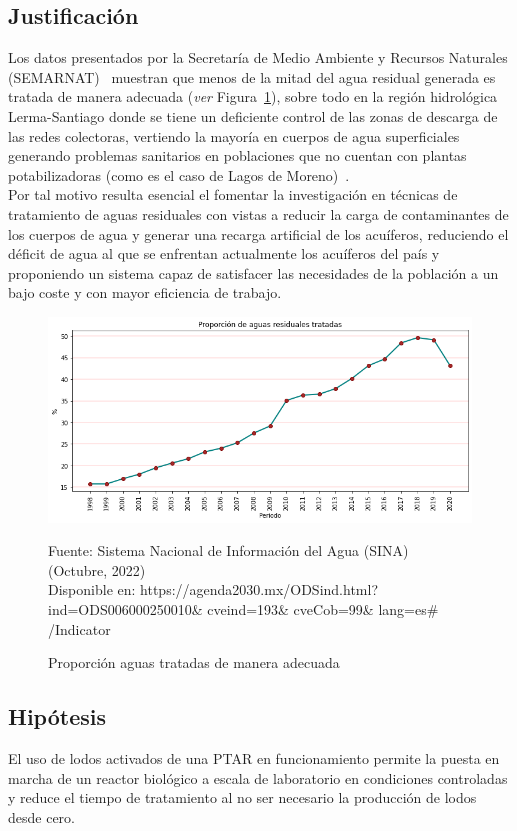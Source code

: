 \subsection*{Justificación}
Los datos presentados por la Secretaría de Medio Ambiente y Recursos Naturales (SEMARNAT)~\emph{\citep{Sis22}} muestran que menos de la mitad del agua residual generada es tratada de manera adecuada (\emph{ver} Figura~\ref{fig:proporcion}), sobre todo en la región hidrológica Lerma-Santiago donde se tiene un deficiente control de las zonas de descarga de las redes colectoras, vertiendo la mayoría en cuerpos de agua superficiales generando problemas sanitarios en poblaciones que no cuentan con plantas potabilizadoras (como es el caso de Lagos de Moreno)~\emph{\citep{aa2030}}.\\
Por tal motivo resulta esencial el fomentar la investigación en técnicas de tratamiento de aguas residuales con vistas a reducir la carga de contaminantes de los cuerpos de agua y generar una recarga artificial de los acuíferos, reduciendo el déficit de agua al que se enfrentan actualmente los acuíferos del país y proponiendo un sistema capaz de satisfacer las necesidades de la población a un bajo coste y con mayor eficiencia de trabajo.
	\begin{figure}[h]
		\centering
		\includegraphics[scale=0.3]{Proporcion_aguas_tratadas.png}
		\caption{Proporción aguas tratadas de manera adecuada}
		\label{fig:proporcion}
		\footnotesize{Fuente: Sistema Nacional de Información del Agua (SINA) (Octubre, 2022)\\
		Disponible en: https://agenda2030.mx/ODSind.html?ind=ODS006000250010\& cveind=193\& cveCob=99\& lang=es\# /Indicator}
	\end{figure}
\subsection*{Hipótesis}
El uso de lodos activados de una PTAR en funcionamiento permite la puesta en marcha de un reactor biológico a escala de laboratorio en condiciones controladas y reduce el tiempo de tratamiento al no ser necesario la producción de lodos desde cero.
